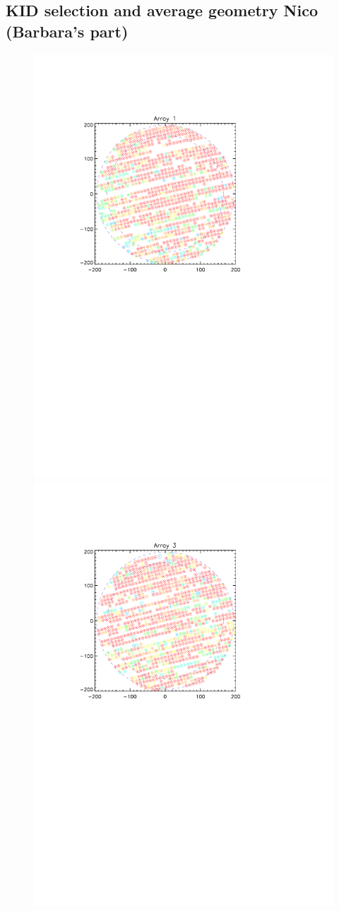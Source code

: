 \subsection{KID selection and average geometry {\color{blue} Nico (Barbara's part)} }
\label{avg_kidpar}


\begin{figure}[p]
\begin{center}
\includegraphics[trim=2cm 14cm 4cm 4cm, clip=true,width=0.55\linewidth]{Figures/A1_fwhm_color_count.pdf}
\includegraphics[trim=2cm 14cm 4cm 4cm, clip=true,width=0.55\linewidth]{Figures/A3_fwhm_color_count.pdf}

\end{center}
\end{figure}
